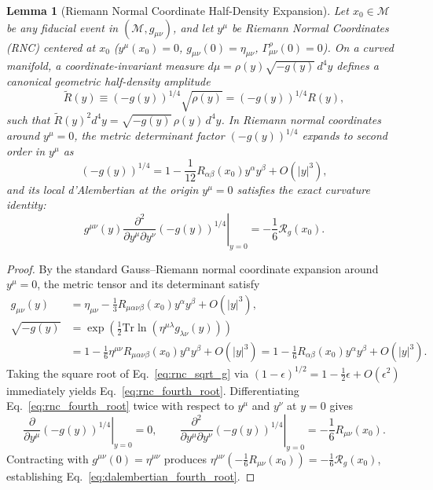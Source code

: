 \documentclass[11pt, a4paper]{article}
\newtheorem{lemma}[theorem]{Lemma}
\theoremstyle{definition}
\begin{document}
\begin{lemma}[Riemann Normal Coordinate Half-Density Expansion]
\label{lem:rnc_half_density}
Let $x_0 \in \mathcal{M}$ be any fiducial event in $(\mathcal{M}, g_{\mu\nu})$, and let $y^\mu$ be Riemann Normal Coordinates (RNC) centered at $x_0$ ($y^\mu(x_0) = 0$, $g_{\mu\nu}(0) = \eta_{\mu\nu}$, $\Gamma^\rho_{\mu\nu}(0) = 0$). On a curved manifold, a coordinate-invariant measure $d\mu = \rho(y)\sqrt{-g(y)}\,d^4y$ defines a canonical geometric half-density amplitude
\begin{equation}
\label{eq:half_density_amp}
\tilde{R}(y) \equiv \left( -g(y) \right)^{1/4} \sqrt{\rho(y)} = \left( -g(y) \right)^{1/4} R(y),
\end{equation}
such that $\tilde{R}(y)^2 d^4y = \sqrt{-g(y)}\,\rho(y)\,d^4y$. In Riemann normal coordinates around $y^\mu = 0$, the metric determinant factor $(-g(y))^{1/4}$ expands to second order in $y^\mu$ as
\begin{equation}
\label{eq:rnc_fourth_root}
\left( -g(y) \right)^{1/4} = 1 - \frac{1}{12} R_{\alpha\beta}(x_0) y^\alpha y^\beta + O(|y|^3),
\end{equation}
and its local d'Alembertian at the origin $y^\mu = 0$ satisfies the exact curvature identity:
\begin{equation}
\label{eq:dalembertian_fourth_root}
\left. g^{\mu\nu}(y) \frac{\partial^2}{\partial y^\mu \partial y^\nu} \left( -g(y) \right)^{1/4} \right|_{y=0} = -\frac{1}{6} \mathcal{R}_g(x_0).
\end{equation}
\end{lemma}

\begin{proof}
By the standard Gauss--Riemann normal coordinate expansion around $y^\mu = 0$, the metric tensor and its determinant satisfy
\begin{align}
g_{\mu\nu}(y) &= \eta_{\mu\nu} - \frac{1}{3} R_{\mu\alpha\nu\beta}(x_0) y^\alpha y^\beta + O(|y|^3), \label{eq:rnc_g} \\
\sqrt{-g(y)} &= \exp\left( \frac{1}{2}\text{Tr}\ln\left(\eta^{\mu\lambda}g_{\lambda\nu}(y)\right) \right) \nonumber \\
&= 1 - \frac{1}{6} \eta^{\mu\nu} R_{\mu\alpha\nu\beta}(x_0) y^\alpha y^\beta + O(|y|^3) = 1 - \frac{1}{6} R_{\alpha\beta}(x_0) y^\alpha y^\beta + O(|y|^3). \label{eq:rnc_sqrt_g}
\end{align}
Taking the square root of Eq.~\eqref{eq:rnc_sqrt_g} via $(1 - \epsilon)^{1/2} = 1 - \frac{1}{2}\epsilon + O(\epsilon^2)$ immediately yields Eq.~\eqref{eq:rnc_fourth_root}. Differentiating Eq.~\eqref{eq:rnc_fourth_root} twice with respect to $y^\mu$ and $y^\nu$ at $y = 0$ gives
\begin{equation}
\left. \frac{\partial}{\partial y^\mu} (-g(y))^{1/4} \right|_{y=0} = 0, \qquad \left. \frac{\partial^2}{\partial y^\mu \partial y^\nu} (-g(y))^{1/4} \right|_{y=0} = -\frac{1}{6} R_{\mu\nu}(x_0).
\end{equation}
Contracting with $g^{\mu\nu}(0) = \eta^{\mu\nu}$ produces $\eta^{\mu\nu}\left(-\frac{1}{6}R_{\mu\nu}(x_0)\right) = -\frac{1}{6}\mathcal{R}_g(x_0)$, establishing Eq.~\eqref{eq:dalembertian_fourth_root}.
\end{proof}
\end{document}
